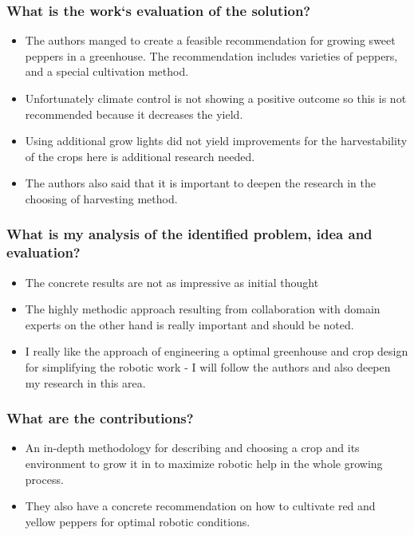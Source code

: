     \subsubsection*{What is the work`s evaluation of the solution?}
    \begin{itemize}
        \item The authors manged to create a feasible recommendation for growing sweet peppers in a greenhouse. The recommendation includes varieties of peppers, and a special cultivation method.
        \item Unfortunately climate control is not showing a positive outcome so this is not recommended because it decreases the yield.
        \item Using additional grow lights did not yield improvements for the harvestability of the crops here is additional research needed.
        \item The authors also said that it is important to deepen the research in the choosing of harvesting method.
    \end{itemize}
    \subsubsection*{What is my analysis of the identified problem, idea and evaluation?}
    \begin{itemize}
        \item The concrete results are not as impressive as initial thought
        \item The highly methodic approach resulting from collaboration with domain experts on the other hand is really important and should be noted.
        \item I really like the approach of engineering a optimal greenhouse and crop design for simplifying the robotic work - I will follow the authors and also deepen my research in this area.
    \end{itemize}
    \subsubsection*{What are the contributions?}
    \begin{itemize}
        \item An in-depth methodology for describing and choosing a crop and its environment to grow it in to maximize robotic help in the whole growing process.
        \item They also have a concrete recommendation on how to cultivate red and yellow peppers for optimal robotic conditions.
    \end{itemize}
